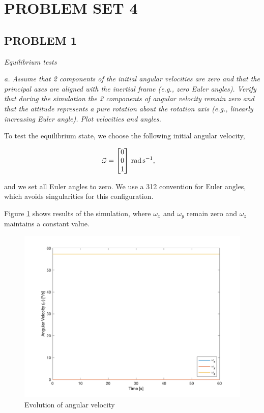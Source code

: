 \section{\Large PROBLEM SET 4}
\subsection{PROBLEM 1}
\textit{Equilibrium tests}

\textit{a. Assume that 2 components of the initial angular velocities are zero and that the principal axes are aligned with the inertial frame (e.g., zero Euler angles). Verify that during the simulation the 2 components of angular velocity remain zero and that the attitude represents a pure rotation about the rotation axis (e.g., linearly increasing Euler angle). Plot velocities and angles.}

To test the equilibrium state, we choose the following initial angular velocity,

\begin{align*}
\Vec{\omega} &= 
\qty[parse-numbers = false]{
    \begin{bmatrix}
    0 \\
    0 \\
    1 \\ 
    \end{bmatrix}
}{\radian\per\s},
\end{align*}

and we set all Euler angles to zero. We use a 312 convention for Euler angles, which avoids singularities for this configuration.

Figure \ref{fig:ps4_problem1a_angvel} shows results of the simulation, where $\omega_x$ and $\omega_y$ remain zero and $\omega_z$ maintains a constant value.

\begin{figure}[H]
\centering
\includegraphics[scale=0.6]{Images/ps4_problem1a_angvel.png}
\caption{Evolution of angular velocity}
\label{fig:ps4_problem1a_angvel}
\end{figure}

